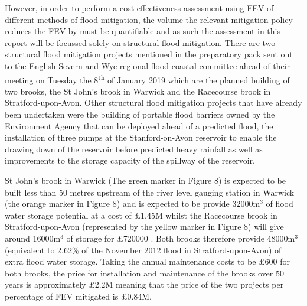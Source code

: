 \documentclass[11pt,a4paper]{article}
\begin{document}
However, in order to perform a cost effectiveness assessment using FEV of different methods of flood mitigation, the volume the relevant mitigation policy reduces the FEV by must be quantifiable and as such the assessment in this report will be focussed solely on structural flood mitigation. There are two structural flood mitigation projects mentioned in the preparatory pack sent out to the English Severn and Wye regional flood coastal committee ahead of their meeting on Tuesday the 8\textsuperscript{th} of January 2019 \cite{brook} which are the planned building of two brooks, the St John's brook in Warwick and the Racecourse brook in Stratford-upon-Avon. Other structural flood mitigation projects that have already been undertaken were the building of portable flood barriers owned by the Environment Agency that can be deployed ahead of a predicted flood, the installation of three pumps at the Stanford-on-Avon reservoir to enable the drawing down of the reservoir before predicted heavy rainfall  as well as improvements to the storage capacity of the spillway of the reservoir.

St John's brook in Warwick (The green marker in Figure 8) is expected to be built less than 50 metres upstream of the river level gauging station in Warwick (the orange marker in Figure 8) and is expected to be provide 32000m$^3$ of flood water storage potential at a cost of \pounds1.45M whilst the Racecourse brook in Stratford-upon-Avon (represented by the yellow marker in Figure 8) will give around 16000m$^3$ of storage for \pounds720000 \cite{brook}. Both brooks therefore provide 48000m$^3$ (equivalent to 2.62\% of the November 2012 flood in Stratford-upon-Avon) of extra flood water storage. Taking the annual maintenance costs to be \pounds600 \cite{cost4} for both brooks, the price for installation and maintenance of the brooks over 50 years is approximately \pounds2.2M meaning that the price of the two projects per percentage of FEV mitigated is \pounds0.84M.
\end{document}
